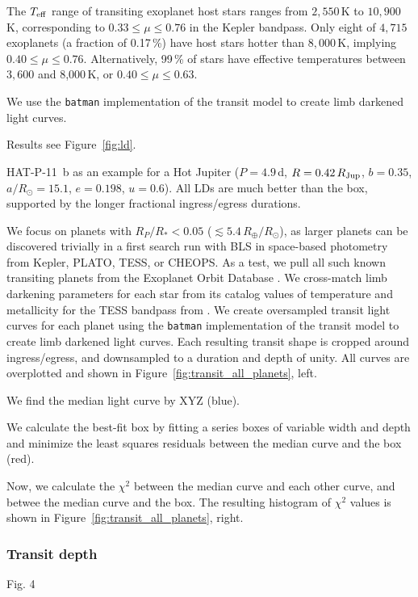 \documentclass[twocolumn,tighten,longauthor]{myaastex62}
\begin{document}
The $T_{\rm eff}$ range of transiting exoplanet host stars ranges from $2,550\,$K to $10,900\,$K, corresponding to $0.33\leq\mu\leq0.76$ in the Kepler bandpass. Only eight of $4,715$ exoplanets (a fraction of 0.17\,\%) have host stars hotter than $8,000\,$K, implying $0.40\leq\mu\leq0.76$. Alternatively, 99\,\% of stars have effective temperatures between $3{,}600$ and 8{,}000\,K, or $0.40\leq\mu\leq0.63$.

We use the \texttt{batman} implementation \citep{2015PASP..127.1161K,2015ascl.soft10002K} of the \cite{2002ApJ...580L.171M} transit model to create limb darkened light curves.

Results see Figure~\ref{fig:ld}.

HAT-P-11~b as an example for a Hot Jupiter ($P=4.9\,$d,  $R=0.42\,R_{\rm Jup}$, $b=0.35$, $a/R_{\odot}=15.1$, $e=0.198$, $u=0.6$). All LDs are much better than the box, supported by the longer fractional ingress/egress durations.

We focus on planets with $R_P/R_{*}<0.05$ ($\lesssim 5.4\,R_{\oplus}/R_{\odot}$), as larger planets can be discovered trivially in a first search run with BLS in space-based photometry from Kepler, PLATO, TESS, or CHEOPS. As a test, we pull all such known transiting planets from the Exoplanet Orbit Database \citep{2011PASP..123..412W}. We cross-match limb darkening parameters for each star from its catalog values of temperature and metallicity for the TESS bandpass from \citep{2017A&A...600A..30C}. We create oversampled transit light curves for each planet using the \texttt{batman} implementation \citep{2015PASP..127.1161K,2015ascl.soft10002K} of the \cite{2002ApJ...580L.171M} transit model to create limb darkened light curves. Each resulting transit shape is cropped around ingress/egress, and downsampled to a duration and depth of unity. All curves are overplotted and shown in Figure~\ref{fig:transit_all_planets}, left.

We find the median light curve by XYZ (blue).

We calculate the best-fit box by fitting a series boxes of variable width and depth and minimize the least squares residuals between the median curve and the box (red).

Now, we calculate the $\chi^2$ between the median curve and each other curve, and betwee the median curve and the box. The resulting histogram of $\chi^2$ values is shown in Figure~\ref{fig:transit_all_planets}, right.

\subsubsection{Transit depth}
Fig. 4
\end{document}
